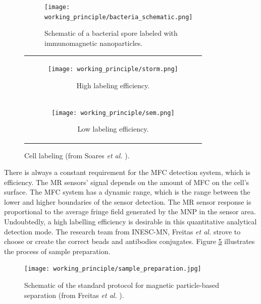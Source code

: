\begin{figure}[!ht]
    \centering
    \begin{subfigure}[c]{.6\textwidth}
        \centering
        \texttt{[image: working\_principle/bacteria\_schematic.png]}
        \caption{Schematic of a bacterial spore labeled with immunomagnetic nanoparticles.}
        \label{figure:bacterial-schematic}
    \end{subfigure}\hfill
    \centering
    \begin{tabular}[c]{@{}c@{}}
        \begin{subfigure}[c]{.4\textwidth}
            \centering
            \texttt{[image: working\_principle/storm.png]}
            \caption{High labeling efficiency.}
            \label{figure:storm}
        \end{subfigure}\\
        \noalign{\bigskip}%
        \begin{subfigure}[c]{.4\textwidth}
            \centering
            \texttt{[image: working\_principle/sem.png]}
            \caption{Low labeling efficiency.}
            \label{figure:sem}
        \end{subfigure}
    \end{tabular}

    \caption{Cell labeling (from Soares \textit{et al.} \cite{Soares2019}).}
    \label{figure:cell-binding}
\end{figure}

There is always a constant requirement for the \ac{MFC} detection system, which is efficiency. The \ac{MR} sensors' signal depends on the amount of \ac{MFC} on the cell's surface. The \ac{MFC} system has a dynamic range, which is the range between the lower and higher boundaries of the sensor detection. The \ac{MR} sensor response is proportional to the average fringe field generated by the \ac{MNP} in the sensor area. Undoubtedly, a high labelling efficiency is desirable in this quantitative analytical detection mode. The research team from \ac{INESC-MN}, Freitas \textit{et al.} \cite{Freitas2017SpintronicBF} strove to choose or create the correct beads and antibodies conjugates. Figure \ref{figure:sample-preparation} illustrates the process of sample preparation.

\begin{figure}[!ht]
    \centering
    \texttt{[image: working\_principle/sample\_preparation.jpg]}
    \caption{Schematic of the standard protocol for magnetic particle-based separation (from Freitas \textit{et al.} \cite{Freitas2017SpintronicBF}).}
    \label{figure:sample-preparation}
\end{figure}

